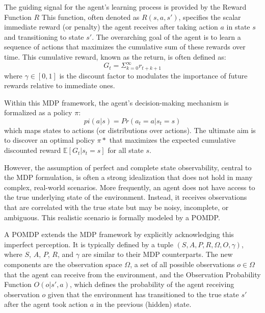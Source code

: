 The guiding signal for the agent's learning process is provided by the Reward Function \(R\) This function, often denoted as \(R(s, a, s')\), specifies the scalar immediate reward (or penalty) the agent receives after taking action \(a\) in state \(s\) and transitioning to state \(s'\). The overarching goal of the agent is to learn a sequence of actions that maximizes the cumulative sum of these rewards over time. This cumulative reward, known as the return, is often defined as:
\[G_t = \Sigma_{k=0}^\infty r_{t+k+1}\]
where \(\gamma \in [0,1]\) is the discount factor to modulates the importance of future rewards relative to immediate ones.

Within this MDP framework, the agent's decision-making mechanism is formalized as a policy \(\pi\):
\[pi(a|s) = Pr(a_t = a | s_t = s)\] 
which maps states to actions (or distributions over actions). The ultimate aim is to discover an optimal policy \(\pi*\) that maximizes the expected cumulative discounted reward \(\mathbb{E}[G_t | s_t = s]\) for all state \(s\).

However, the assumption of perfect and complete state observability, central to the \gls{MDP} formulation, is often a strong idealization that does not hold in many complex, real-world scenarios. More frequently, an agent does not have access to the true underlying state of the environment. Instead, it receives observations that are correlated with the true state but may be noisy, incomplete, or ambiguous. This realistic scenario is formally modeled by a \gls{POMDP}.

A \gls{POMDP} extends the \gls{MDP} framework by explicitly acknowledging this imperfect perception. It is typically defined by a tuple \((S, A, P, R, \Omega, O, \gamma)\), where \(S\), \(A\), \(P\), \(R\), and \(\gamma\) are similar to their \gls{MDP} counterparts. The new components are the observation space \(\Omega\), a set of all possible observations \(o \in \Omega\) that the agent can receive from the environment, and the Observation Probability Function \(O(o | s', a)\), which defines the probability of the agent receiving observation \(o\) given that the environment has transitioned to the true state \(s'\) after the agent took action \(a\) in the previous (hidden) state.

